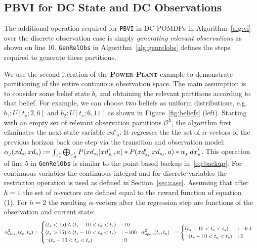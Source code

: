 \documentclass{article} %
\begin{document}
\subsection{PBVI for DC State and DC Observations} 
\label{sec:cont_obs}

The additional operation required for \texttt{PBVI} in DC-POMDPs in
Algorithm~\ref{alg:vi} over the discrete observation case is simply
\emph{generating relevant observations} as shown on line 10.
\texttt{GenRelObs} in Algorithm~\ref{alg:genrelobs} defines the steps
required to generate these partitions.

We use the second iteration of the \textsc{\bf Power Plant} example to
demonstrate partitioning of the entire continuous observation
space. The main assumption is to consider some belief state $b_i$ and
obtaining the relevant partitions according to that belief. For
example, we can choose two beliefs as uniform distributions,
e.g. $b_1: U[t_s;2,6]$ and $b_2: U[t_s;6,11]$ as shown in
Figure~\ref{fig:beliefs} (left).  Starting with an empty set of
relevant observation partitions $\mathcal{O}^h$, the algorithm first
eliminates the next state variable $xd'_s$. It regresses the
the set of
$\alpha$-vectors of the previous horizon back one step via
the transition and observation model: $\alpha_j(xd_s,xd_o) :=
\int_{x_s'} \bigoplus_{x_d'} P(xd_{o_i}|xd'_{s_i},a) * P(xd'_{s_i}| xd_{s_i},a)* \alpha_j\hspace{1mm}dx_s'
$.  This operation of line 5 in \texttt{GenRelObs} is similar to 
the point-based backup in~\eqref{eq:backup}. For
continuous variables the continuous integral and for discrete
variables the restriction operation is used as defined in
Section~\ref{sec:case}.  
Assuming that after $h=1$ the set of $\alpha$-vectors are
defined equal to the reward function of equation (1).
For $h=2$ the resulting $\alpha$-vectors after the regression step are functions of the observation and current state: 
{\footnotesize
\vspace{-2mm}
\begin{align}
\alpha_{close}^2(t_s,t_o) &= 
\begin{cases}
 (t_s<15)\wedge (t_s - 10 < t_o<t_s) &: 10 \\
(t_s>15)\wedge (t_s - 10 < t_o<t_s) &: -100  \\
\neg(t_s - 10 < t_o<t_s) &: 0
\end{cases}
\hspace{2mm} 
\alpha_{open}^2(t_s,t_o) &= \begin{cases}
(t_s - 10 < t_o<t_s) &: -0.1 \\
\neg(t_s - 10 < t_o<t_s) &: 0
\end{cases}
\nonumber
\end{align}
} 
\end{document}
